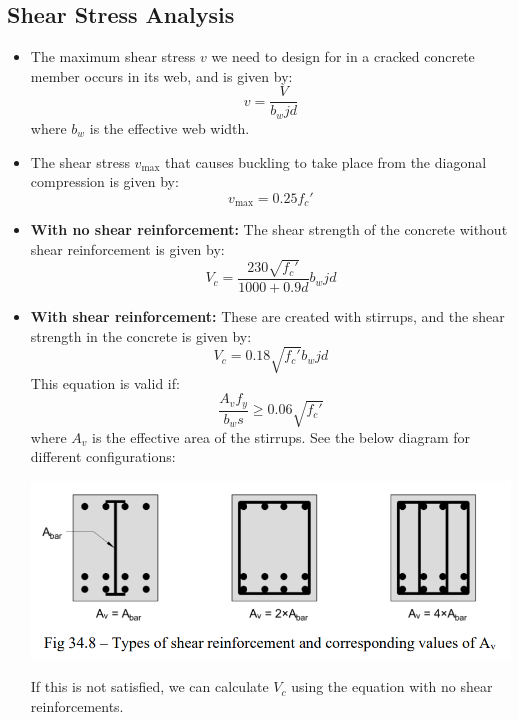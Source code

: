\documentclass{article}
\begin{document}
\subsection{Shear Stress Analysis}
\begin{itemize}
    \item The maximum shear stress $v$ we need to design for in a cracked concrete member occurs in its web, and is given by:
    \begin{equation}
        v = \frac{V}{b_wjd}
        \label{eq:}
    \end{equation}
    where $b_w$ is the effective web width.
    \item The shear stress $v_\text{max}$ that causes buckling to take place from the diagonal compression is given by:
    \begin{equation}
        v_\text{max} = 0.25f_c'
        \label{eq:}
    \end{equation}
    \item \textbf{With no shear reinforcement:} The shear strength of the concrete without shear reinforcement is given by:
    \begin{equation}
        V_c = \frac{230\sqrt{f_c'}}{1000+0.9d}b_wjd
        \label{eq:}
    \end{equation}
    \item \textbf{With shear reinforcement:} These are created with stirrups, and the shear strength in the concrete is given by:
    \begin{equation}
        V_c = 0.18\sqrt{f_c'}b_wjd
        \label{eq:}
    \end{equation}
    This equation is valid if:
    \begin{equation}
        \frac{A_vf_y}{b_ws} \ge 0.06\sqrt{f_c'}
        \label{eq:}
    \end{equation}
    where $A_v$ is the effective area of the stirrups. See the below diagram for different configurations:
    \begin{center}
        \includegraphics[width=0.8\linewidth]{stirrup_types.PNG}
    \end{center}
    If this is not satisfied, we can calculate $V_c$ using the equation with no shear reinforcements.

\end{itemize}
\end{document}
